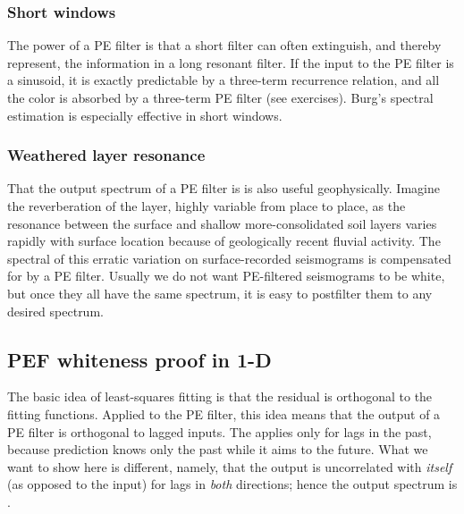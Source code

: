 \subsubsection{Short windows}
\par
The power of a PE filter is that a short filter can often extinguish,
and thereby represent, the information in a long resonant filter.
If the input to the PE filter is a sinusoid,
it is exactly predictable by a three-term recurrence relation,
and all the color is absorbed by a three-term PE filter (see exercises).
Burg's spectral estimation is especially effective in short windows.

\subsubsection{Weathered layer resonance}
\par
That the output spectrum of a PE filter is  is also
useful geophysically.
Imagine the reverberation of the  layer,
highly variable from place to place,
as the resonance between the surface and shallow
more-consolidated soil layers
varies rapidly with surface location
because
of geologically recent fluvial activity.
The spectral  of this erratic variation on surface-recorded
seismograms is compensated for by a PE filter.
Usually we do not want PE-filtered seismograms to be white,
but once they all have the same spectrum,
it is easy to postfilter them to any desired spectrum.





\subsection{PEF whiteness proof in 1-D}
\par
\label{mda/'white_proof'}
The basic idea of least-squares fitting
is that the residual is orthogonal to the fitting functions.
Applied to the PE filter, this idea means
that the output of a PE filter is orthogonal to lagged inputs.
The  applies only for lags in the past,
because prediction knows only the past while it aims to the future.
What we want to show here is different,
namely, that the output is uncorrelated with {\it itself}
(as opposed to the input) for lags in {\it both} directions;
hence the output spectrum is .

